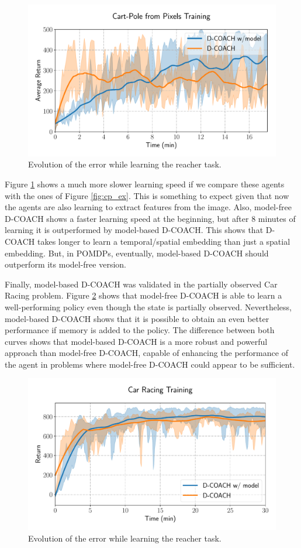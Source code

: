 \begin{figure}[h]
    \centering
    \includegraphics[width=0.9\linewidth]{imagenes/cap3/cartpole_HD_model.pdf}
    \caption{Evolution of the error while learning the reacher task. }
    \label{fig:cp_hd}
\end{figure}

Figure \ref{fig:cp_hd} shows a much more slower learning speed if we compare these agents with the ones of Figure \ref{fig:cp_ex}. This is something to expect given that now the agents are also learning to extract features from the image. Also, model-free D-COACH shows a faster learning speed at the beginning, but after 8 minutes of learning it is outperformed by model-based D-COACH. This shows that D-COACH takes longer to learn a temporal/spatial embedding than just a spatial embedding. But, in POMDPs, eventually, model-based D-COACH should outperform its model-free version.

Finally, model-based D-COACH was validated in the partially observed Car Racing problem. Figure \ref{fig:po_cr} shows that model-free D-COACH is able to learn a well-performing policy even though the state is partially observed. Nevertheless, model-based D-COACH shows that it is possible to obtain an even better performance if memory is added to the policy. The difference between both curves shows that model-based D-COACH is a more robust and powerful approach than model-free D-COACH, capable of enhancing the performance of the agent in problems where model-free D-COACH could appear to be sufficient.

\begin{figure}[h]
    \centering
    \includegraphics[width=0.9\linewidth]{imagenes/cap3/car_racing_lstm.pdf}
    \caption{Evolution of the error while learning the reacher task. }
    \label{fig:po_cr}
\end{figure}


